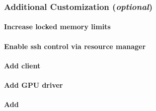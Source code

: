 \documentclass[letterpaper]{article}
\begin{document}


\subsubsection{Additional Customization ({\em optional})} \label{sec:addl_customizations}


\paragraph{Increase locked memory limits}


\paragraph{Enable ssh control via resource manager}


\paragraph{Add \Lustre{} client} \label{sec:lustre_client}




\vspace*{0.4cm}

\paragraph{Add GPU driver}



\paragraph{Add \clustershell{}}

\end{document}
